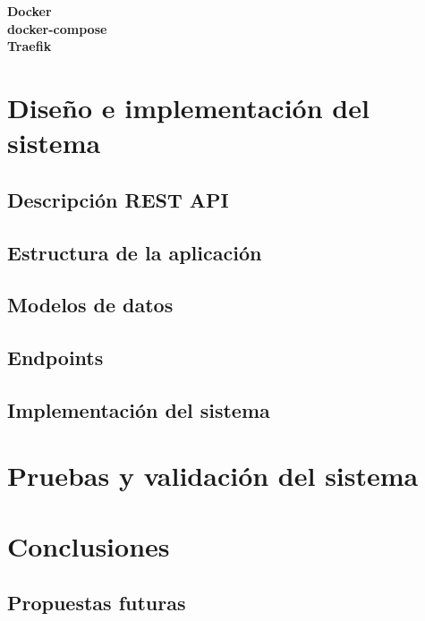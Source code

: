 \documentclass[a4paper, oneside, 12pt]{book}
\begin{document}
	\noindent \textbf{\large Docker} \\
	
	\noindent \textbf{\large docker-compose} \\
	
	\noindent \textbf{\large Traefik} \\
	
	\pagebreak
	
	\chapter{Diseño e implementación del sistema}
	
	\section{Descripción REST API}
	
	\section{Estructura de la aplicación}
	
	\section{Modelos de datos}
	
	\section{Endpoints}
	
	\section{Implementación del sistema}
	
	\pagebreak
	
	\chapter{Pruebas y validación del sistema}
	
	\pagebreak
	
	\chapter{Conclusiones}
	
	\section{Propuestas futuras}
	
\end{document}
